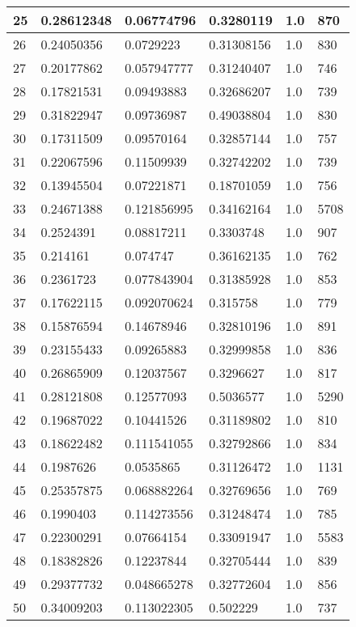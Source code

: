 \begin{longtable}{|l|l|l|l|l|l|}
25 & 0.28612348 & 0.06774796 & 0.3280119 & 1.0 & 870 \\ \hline 
26 & 0.24050356 & 0.0729223 & 0.31308156 & 1.0 & 830 \\ \hline 
27 & 0.20177862 & 0.057947777 & 0.31240407 & 1.0 & 746 \\ \hline 
28 & 0.17821531 & 0.09493883 & 0.32686207 & 1.0 & 739 \\ \hline 
29 & 0.31822947 & 0.09736987 & 0.49038804 & 1.0 & 830 \\ \hline 
30 & 0.17311509 & 0.09570164 & 0.32857144 & 1.0 & 757 \\ \hline 
31 & 0.22067596 & 0.11509939 & 0.32742202 & 1.0 & 739 \\ \hline 
32 & 0.13945504 & 0.07221871 & 0.18701059 & 1.0 & 756 \\ \hline 
33 & 0.24671388 & 0.121856995 & 0.34162164 & 1.0 & 5708 \\ \hline 
34 & 0.2524391 & 0.08817211 & 0.3303748 & 1.0 & 907 \\ \hline 
35 & 0.214161 & 0.074747 & 0.36162135 & 1.0 & 762 \\ \hline 
36 & 0.2361723 & 0.077843904 & 0.31385928 & 1.0 & 853 \\ \hline 
37 & 0.17622115 & 0.092070624 & 0.315758 & 1.0 & 779 \\ \hline 
38 & 0.15876594 & 0.14678946 & 0.32810196 & 1.0 & 891 \\ \hline 
39 & 0.23155433 & 0.09265883 & 0.32999858 & 1.0 & 836 \\ \hline 
40 & 0.26865909 & 0.12037567 & 0.3296627 & 1.0 & 817 \\ \hline 
41 & 0.28121808 & 0.12577093 & 0.5036577 & 1.0 & 5290 \\ \hline 
42 & 0.19687022 & 0.10441526 & 0.31189802 & 1.0 & 810 \\ \hline 
43 & 0.18622482 & 0.111541055 & 0.32792866 & 1.0 & 834 \\ \hline 
44 & 0.1987626 & 0.0535865 & 0.31126472 & 1.0 & 1131 \\ \hline 
45 & 0.25357875 & 0.068882264 & 0.32769656 & 1.0 & 769 \\ \hline 
46 & 0.1990403 & 0.114273556 & 0.31248474 & 1.0 & 785 \\ \hline 
47 & 0.22300291 & 0.07664154 & 0.33091947 & 1.0 & 5583 \\ \hline 
48 & 0.18382826 & 0.12237844 & 0.32705444 & 1.0 & 839 \\ \hline 
49 & 0.29377732 & 0.048665278 & 0.32772604 & 1.0 & 856 \\ \hline 
50 & 0.34009203 & 0.113022305 & 0.502229 & 1.0 & 737 \\ \hline 
\end{longtable}